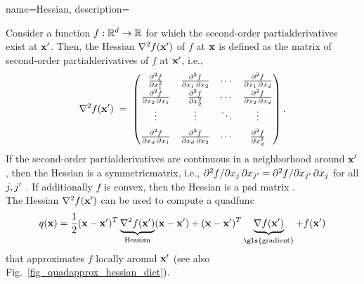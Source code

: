 {name={Hessian},
 	description={Consider a \gls{function} 
		$f: \mathbb{R}^{d} \to \mathbb{R}$ for which the second-order 
		\glspl{partialderivative} exist at ${\bf x}'$. Then, the Hessian $\nabla^2 f({\bf x}')$ 
		of $f$ at ${\bf x}$ is defined as the \gls{matrix} of second-order 
		\glspl{partialderivative} of $f$ at ${\bf x}'$, i.e., 
		$$\nabla^{2} f({\bf x}') \;=\;
		\begin{pmatrix}
			\frac{\partial^{2} f}{\partial x_{1}^{2}}
			& \frac{\partial^{2} f}{\partial x_{1}\, \partial x_{2}}
			& \cdots
			& \frac{\partial^{2} f}{\partial x_{1}\, \partial x_{d}} \\
			\frac{\partial^{2} f}{\partial x_{2}\, \partial x_{1}}
			& \frac{\partial^{2} f}{\partial x_{2}^{2}}
			& \cdots
			& \frac{\partial^{2} f}{\partial x_{2}\, \partial x_{d}} \\
			\vdots & \vdots & \ddots & \vdots \\[1.2ex]
			\frac{\partial^{2} f}{\partial x_{d}\, \partial x_{1}}
			& \frac{\partial^{2} f}{\partial x_{d}\, \partial x_{2}}
			& \cdots
			& \frac{\partial^{2} f}{\partial x_{d}^{2}}
		\end{pmatrix}.$$
		If the second-order \glspl{partialderivative} are \gls{continuous} in a \gls{neighborhood} around ${\bf x}'$, 
		then the Hessian is a \gls{symmetricmatrix}, i.e.,
		${\partial^{2} f}/{\partial x_{j}\, \partial x_{j'}} = 
		{\partial^{2} f}/{\partial x_{j'}\, \partial x_{j}}$ for all 
		$j, j'$ \cite{RudinBookPrinciplesMatheAnalysis}. If additionally $f$ 
		is \gls{convex}, then the Hessian is a \gls{psd} \gls{matrix} \cite{BoydConvexBook}.\\
		The Hessian $\nabla^2 f({\bf x}')$ can be used to compute a \gls{quadfunc} 
		$$q(\featurevec) = \frac{1}{2} (\featurevec- \featurevec')^{T} \underbrace{\nabla^2 f(\featurevec')}_{\text{Hessian}} 
		(\featurevec- \featurevec') +  (\featurevec- \featurevec')^{T} \underbrace{\nabla f(\featurevec')}_{\text{\gls{gradient}}} 
		+ f(\featurevec')$$
		that approximates $f$ locally around ${\bf x}'$ (see also Fig.\ \ref{fig_quadapprox_hessian_dict}). 
		\begin{figure}[H]
		\begin{center}
		\begin{tikzpicture}[x=0.5cm]

\end{tikzpicture}
\end{center}
\end{figure}}}
